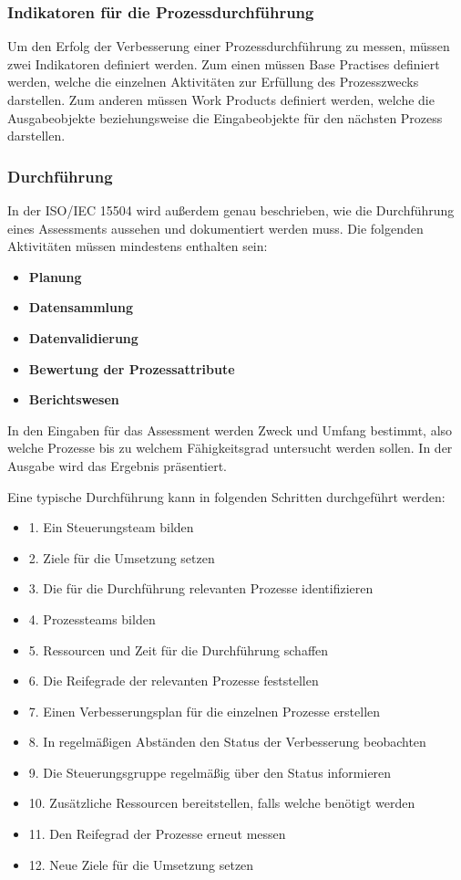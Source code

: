 \subsubsection{Indikatoren für die Prozessdurchführung}

Um den Erfolg der Verbesserung einer Prozessdurchführung zu messen, müssen zwei Indikatoren definiert werden. Zum einen müssen Base Practises definiert werden, welche die einzelnen Aktivitäten zur Erfüllung des Prozesszwecks darstellen. Zum anderen müssen Work Products definiert werden, welche die Ausgabeobjekte beziehungsweise die Eingabeobjekte für den nächsten Prozess darstellen.

\subsubsection{Durchführung}

In der ISO/IEC 15504 wird außerdem genau beschrieben, wie die Durchführung eines Assessments aussehen und dokumentiert werden muss. Die folgenden Aktivitäten müssen mindestens enthalten sein:

\begin{itemize}
  \item \textbf{Planung}
	\item \textbf{Datensammlung}
	\item \textbf{Datenvalidierung}
	\item \textbf{Bewertung der Prozessattribute}
	\item \textbf{Berichtswesen}
\end{itemize}

In den Eingaben für das Assessment werden Zweck und Umfang bestimmt, also welche Prozesse bis zu welchem Fähigkeitsgrad untersucht werden sollen. In der Ausgabe wird das Ergebnis präsentiert.

Eine typische Durchführung kann in folgenden Schritten durchgeführt werden:

\begin{itemize}
  \item 1. Ein Steuerungsteam bilden
	\item 2. Ziele für die Umsetzung setzen
	\item 3. Die für die Durchführung relevanten Prozesse identifizieren
	\item 4. Prozessteams bilden
	\item 5. Ressourcen und Zeit für die Durchführung schaffen
	\item 6. Die Reifegrade der relevanten Prozesse feststellen
	\item 7. Einen Verbesserungsplan für die einzelnen Prozesse erstellen
	\item 8. In regelmäßigen Abständen den Status der Verbesserung beobachten
	\item 9. Die Steuerungsgruppe regelmäßig über den Status informieren
	\item 10. Zusätzliche Ressourcen bereitstellen, falls welche benötigt werden
	\item 11. Den Reifegrad der Prozesse erneut messen
	\item 12. Neue Ziele für die Umsetzung setzen
\end{itemize}

